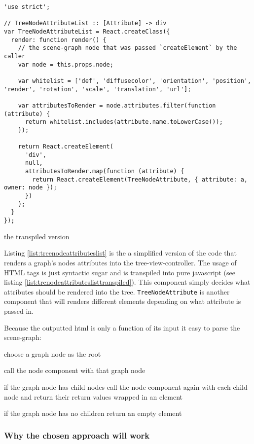 \begin{listing}
  \begin{verbatim}
'use strict';

// TreeNodeAttributeList :: [Attribute] -> div
var TreeNodeAttributeList = React.createClass({
  render: function render() {
    // the scene-graph node that was passed `createElement` by the caller
    var node = this.props.node;

    var whitelist = ['def', 'diffusecolor', 'orientation', 'position', 'render', 'rotation', 'scale', 'translation', 'url'];

    var attributesToRender = node.attributes.filter(function (attribute) {
      return whitelist.includes(attribute.name.toLowerCase());
    });

    return React.createElement(
      'div',
      null,
      attributesToRender.map(function (attribute) {
        return React.createElement(TreeNodeAttribute, { attribute: a, owner: node });
      })
    );
  }
});
  \end{verbatim}
  \caption{the transpiled version}
  \label{list:trenodeattributeslisttranspiled}
\end{listing}

Listing \ref{list:treenodeattributeslist} is the a simplified version of the code that renders a
graph's nodes attributes into the tree-view-controller.
The usage of HTML tags is just syntactic sugar and is transpiled into pure javascript (see listing \ref{list:trenodeattributeslisttranspiled}).
This component simply decides what attributes should be rendered into the tree.
\texttt{TreeNodeAttribute} is another component that will renders
different elements depending on what attribute is passed in.

Because the outputted html is only a function of its input it easy to
parse the scene-graph:
\begin{enumerate*}
  \item choose a graph node as the root 
  \item call the node component with that graph node 
  \item if the graph node has child nodes call the node component again with each child node and return their return values wrapped in an element 
  \item if the graph node has no children return an empty element
\end{enumerate*}

\subsubsection{Why the chosen approach will
work}\label{why-the-chosen-approach-will-work}

